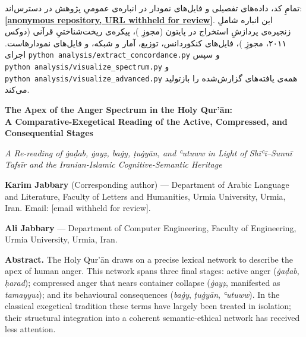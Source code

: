 \documentclass[12pt,a4paper]{article}
\newenvironment{englishabstract}
  {%
    \clearpage
    \begin{LTR}%
    \DefaultMathsDigits
    \englishbody
    \setstretch{1.25}%
    \setlength{\parindent}{0pt}%
    \setlength{\parskip}{0.6em plus 0.2em}%
  }%
  {\end{LTR}}
\begin{document}
\begin{RTL}
\begin{otherlanguage}{persian}
تمامِ کد، داده‌های تفصیلی و فایل‌های نمودار در انباره‌ی عمومیِ پژوهش در
دسترس‌اند:
\textbf{\href{https://\%5Banonymous\%20repository,\%20URL\%20withheld\%20for\%20review\%5D}{{[}anonymous
repository, URL withheld for review{]}}}. این انباره شاملِ زنجیره‌ی پردازشِ
استخراج در پایتون (مجوزِ )، پیکره‌ی ریخت‌شناختیِ قرآنی (دوکس ۲۰۱۱،
مجوزِ )، فایل‌های  کنکوردانس، توزیع، آمار و شبکه، و
فایل‌های  نمودارهاست. اجرای
\texttt{python\ analysis/extract\_concordance.py} و سپس
\texttt{python\ analysis/visualize\_spectrum.py} و
\texttt{python\ analysis/visualize\_advanced.py} همه‌ی یافته‌های گزارش‌شده
را بازتولید می‌کند.

\end{otherlanguage}
\end{RTL}

\begin{englishabstract}

\begin{center}
{\Large\bfseries The Apex of the Anger Spectrum in the Holy Qur’ān:\\
A Comparative-Exegetical Reading of the Active, Compressed, and Consequential Stages\par}
\vspace{6pt}
{\itshape A Re-reading of ġaḍab, ġayẓ, baġy, ṭuġyān, and ʿutuww in Light of Shīʿī–Sunnī Tafsīr and the Iranian-Islamic Cognitive-Semantic Heritage\par}
\end{center}

\vspace{6pt}

\textbf{Karim Jabbary} (Corresponding author) — Department of Arabic Language and Literature, Faculty of Letters and Humanities, Urmia University, Urmia, Iran. Email: [email withheld for review].

\textbf{Ali Jabbary} — Department of Computer Engineering, Faculty of Engineering, Urmia University, Urmia, Iran.

\vspace{8pt}

\noindent\textbf{Abstract.} The Holy Qur’ān draws on a precise lexical network to describe the apex of human anger. This network spans three final stages: active anger (\textit{ġaḍab}, \textit{ḥarad}); compressed anger that nears container collapse (\textit{ġayẓ}, manifested as \textit{tamayyuz}); and its behavioural consequences (\textit{baġy}, \textit{ṭuġyān}, \textit{ʿutuww}). In the classical exegetical tradition these terms have largely been treated in isolation; their structural integration into a coherent semantic-ethical network has received less attention.


\end{englishabstract}
\end{document}
